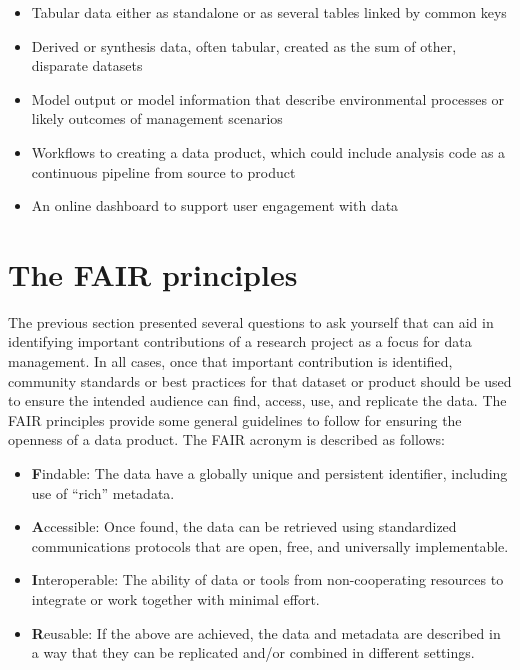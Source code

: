 \documentclass[
]{book}
\providecommand{\tightlist}{%
  \setlength{\itemsep}{0pt}\setlength{\parskip}{0pt}}
\begin{document}
\begin{itemize}
\tightlist
\item
  Tabular data either as standalone or as several tables linked by common keys
\item
  Derived or synthesis data, often tabular, created as the sum of other, disparate datasets
\item
  Model output or model information that describe environmental processes or likely outcomes of management scenarios
\item
  Workflows to creating a data product, which could include analysis code as a continuous pipeline from source to product
\item
  An online dashboard to support user engagement with data
\end{itemize}

\hypertarget{fair}{%
\section{The FAIR principles}\label{fair}}

The previous section presented several questions to ask yourself that can aid in identifying important contributions of a research project as a focus for data management. In all cases, once that important contribution is identified, community standards or best practices for that dataset or product should be used to ensure the intended audience can find, access, use, and replicate the data. The FAIR principles \citep{Wilkinson16} provide some general guidelines to follow for ensuring the openness of a data product. The FAIR acronym is described as follows:

\begin{itemize}
\tightlist
\item
  \textbf{F}indable: The data have a globally unique and persistent identifier, including use of ``rich'' metadata.
\item
  \textbf{A}ccessible: Once found, the data can be retrieved using standardized communications protocols that are open, free, and universally implementable.
\item
  \textbf{I}nteroperable: The ability of data or tools from non-cooperating resources to integrate or work together with minimal effort.
\item
  \textbf{R}eusable: If the above are achieved, the data and metadata are described in a way that they can be replicated and/or combined in different settings.
\end{itemize}
\end{document}
